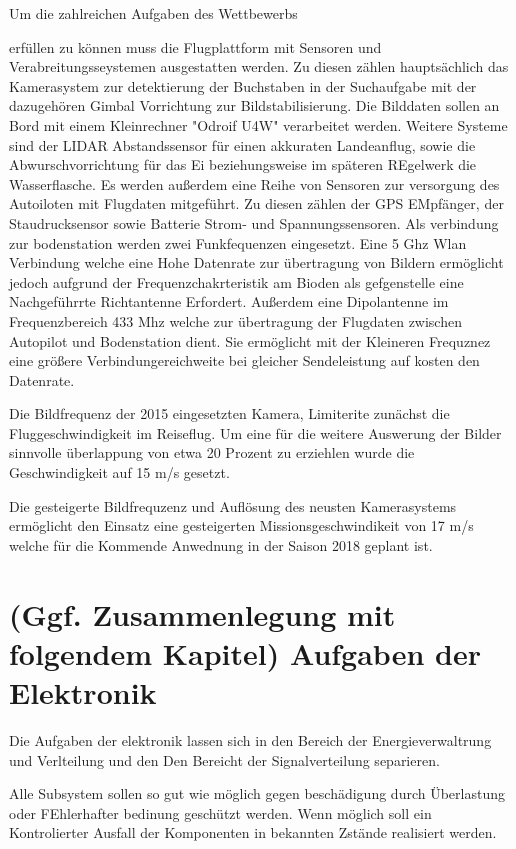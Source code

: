 Um die zahlreichen Aufgaben des Wettbewerbs \begin{comment} Verweis auf Wettbewerbsaufben \end{comment}
erfüllen zu können muss die Flugplattform mit Sensoren und Verabreitungsseystemen ausgestatten werden.
Zu diesen zählen hauptsächlich das Kamerasystem zur detektierung der Buchstaben in der Suchaufgabe mit der dazugehören
Gimbal Vorrichtung zur Bildstabilisierung. Die Bilddaten sollen an Bord mit einem Kleinrechner "Odroif U4W" verarbeitet werden. Weitere Systeme sind der LIDAR Abstandssensor für einen akkuraten Landeanflug, sowie die Abwurschvorrichtung für das Ei beziehungsweise im späteren REgelwerk die Wasserflasche.
Es werden außerdem eine Reihe von Sensoren zur versorgung des Autoiloten mit Flugdaten mitgeführt. Zu diesen zählen der GPS EMpfänger, der Staudrucksensor sowie Batterie Strom- und Spannungssensoren.
Als verbindung zur bodenstation werden zwei Funkfequenzen eingesetzt.
Eine 5 Ghz Wlan Verbindung welche eine Hohe Datenrate zur übertragung von Bildern  ermöglicht jedoch aufgrund der Frequenzchakrteristik am Bioden als gefgenstelle eine Nachgeführrte Richtantenne Erfordert.
Außerdem eine Dipolantenne im Frequenzbereich 433 Mhz welche zur übertragung der Flugdaten zwischen Autopilot und Bodenstation dient. Sie ermöglicht mit der Kleineren Frequznez eine größere Verbindungereichweite bei gleicher Sendeleistung auf kosten den Datenrate.

Die Bildfrequenz der 2015 eingesetzten Kamera, Limiterite zunächst die Fluggeschwindigkeit im Reiseflug. Um eine für die weitere Auswerung der Bilder sinnvolle überlappung von etwa 20 Prozent zu erziehlen wurde die Geschwindigkeit auf 15 m/s gesetzt.

Die gesteigerte Bildfrequzenz und Auflösung des neusten Kamerasystems ermöglicht den Einsatz eine gesteigerten Missionsgeschwindikeit von 17 m/s welche für die Kommende Anwednung in der Saison 2018 geplant ist.

\section{(Ggf. Zusammenlegung mit folgendem Kapitel) Aufgaben der Elektronik}

Die Aufgaben der elektronik lassen sich in den Bereich der Energieverwaltrung und Verlteilung  und den Den Bereicht der Signalverteilung separieren.

Alle Subsystem sollen so gut wie möglich gegen beschädigung durch Überlastung oder FEhlerhafter bedinung geschützt werden.
Wenn möglich soll ein Kontrolierter Ausfall der Komponenten in bekannten Zstände realisiert werden.

